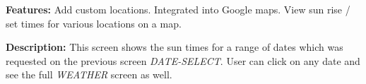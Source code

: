 \documentclass[11pt,english,numbers=endperiod,parskip=half]{scrartcl}
\begin{document}
\textbf{Features: }Add custom locations. Integrated into Google maps. View sun
rise / set times for various locations on a map.

\begin{figure}[H]
\end{figure}
\bigskip
\textbf{Description: }This screen shows the sun times for a range of dates which
was requested on the previous screen \textit{DATE-SELECT}. User can click on any
date and see the full \textit{WEATHER} screen as well.
\end{document}
